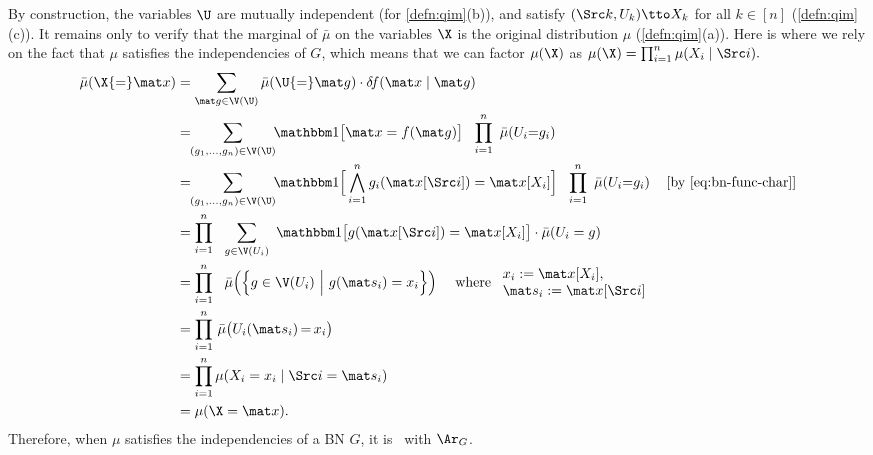 \begin{subappendices}
\begin{lproof}
    By construction, the variables $\U$ are mutually independent (for \cref{defn:qim}(b)), and satisfy $(\Src k, U_k) \tto X_k$ for all $k \in [n]$ (\cref{defn:qim}(c)). 
    It remains only to verify that the marginal of $\bar \mu$ on the variables $\X$ is the original distribution $\mu$ (\cref{defn:qim}(a)). 
    Here is where we rely on the fact that $\mu$ satisfies the independencies of $G$, which means that we can factor $\mu(\X)$ as    $
        \mu(\X) = \prod_{i=1}^n \mu(X_i \mid \Src i).
    $
    \begin{align*}
        \bar\mu(\X{=}\mat x) 
        &= \sum_{\mat g \in \V(\U)} \bar\mu(\U{=}\mat g) 
            \cdot\delta\!f(\mat x \mid \mat g)
        \\
        &= \!\! \sum_{{(g_1, \ldots, g_n) \in \V(\U)}}\!\!
            \mathbbm1
                \big[
                \mat x = f(\mat g)
                \big] ~~
            \prod_{i=1}^n~ \bar\mu(U_i{=}g_i) \\
        &= \!\! \sum_{{(g_1, \ldots, g_n) \in \V(\U)}}\!\!
            \mathbbm1
                \Big[
                 \bigwedge_{i=1}^n g_i( \mat x[\Src i] ) = \mat x[X_i]
                \Big] ~~
            \prod_{i=1}^n~ \bar\mu(U_i{=}g_i) 
            & [\text{by \eqref{eq:bn-func-char}}]
            \\
        &= \prod_{i=1}^n~~
            \sum_{{g \in \V(U_i)}} ~
            \mathbbm 1\big[ g(\mat x[\Src i]) = \mat x[X_i] \big] 
            \cdot
            \bar\mu(U_i = g) \\
        &= \prod_{i=1}^n~~
            \bar\mu \Big(\Big\{
                    g \in \V(U_i) ~\Big|~
                    g( \mat s_i ) = x_i
                \Big\}\Big)
                \quad\text{ where }
                \begin{array}{l} 
                    x_i := \mat x[X_i],\\
                    \mat s_i := \mat x[\Src i]
                \end{array} \\
        &= \prod_{i=1}^n \,
            \bar\mu \big( U_i(\mat s_i) \,{=}\, x_i \big) \\
        &= \prod_{i=1}^n
            \mu(X_i = x_i \mid \Src i = \mat s_i) \\
        &= \mu(\X = \mat x).
    \end{align*}
    Therefore, when $\mu$ satisfies the independencies of a BN $G$, it is \scible\ with $\Ar_G$.
\end{lproof}


\end{subappendices}
